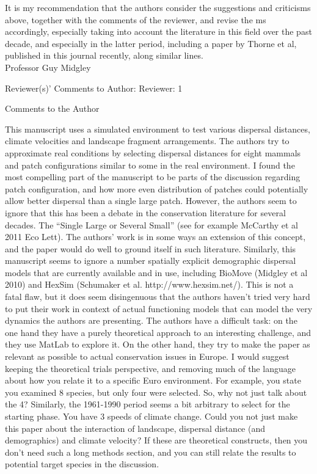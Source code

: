 \documentclass[12pt,pdftex]{article}
\begin{document}
It is my recommendation that the authors consider the suggestions and criticisms above, together with the comments of the reviewer, and revise the ms accordingly, especially taking into account the literature in this field over the past decade, and especially in the latter period, including a paper by Thorne et al, published in this journal recently, along similar lines.\\

Professor Guy Midgley

Reviewer(s)' Comments to Author:
Reviewer: 1

Comments to the Author

This manuscript uses a simulated environment to test various dispersal distances, climate velocities and landscape fragment arrangements. The authors try to approximate real conditions by selecting dispersal distances for eight mammals and patch configurations similar to some in the real environment.
I found the most compelling part of the manuscript to be parts of the discussion regarding patch configuration, and how more even distribution of patches could potentially allow better dispersal than a single large patch. However, the authors seem to ignore that this has been a debate in the conservation literature for several decades. The “Single Large or Several Small”  (see for example McCarthy et al 2011 Eco Lett). The authors’ work is in some ways an extension of this concept, and the paper would do well to ground itself in such literature. 
Similarly, this manuscript seems to ignore a number spatially explicit demographic dispersal models that are currently available and in use, including BioMove (Midgley et al 2010) and HexSim (Schumaker et al. http://www.hexsim.net/).  This is not a fatal flaw, but it does seem disingenuous that the authors haven’t tried very hard to put their work in context of actual functioning models that can model the very dynamics the authors are presenting. 
The authors have a difficult task: on the one hand they have a purely theoretical approach to an interesting challenge, and they use MatLab to explore it. On the other hand, they try to make the paper as relevant as possible to actual conservation issues in Europe. I would suggest keeping the theoretical trials perspective, and removing much of the language about how you relate it to a specific Euro environment. 
For example, you state you examined 8 species, but only four were selected. So, why not just talk about the 4? Similarly, the 1961-1990 period seems a bit arbitrary to select for the starting phase. You have 3 speeds of climate change. Could you not just make this paper about the interaction of landscape, dispersal distance (and demographics) and climate velocity? If these are theoretical constructs, then you don’t need such a long methods section, and you can still relate the results to potential target species in the discussion. 
\end{document}
